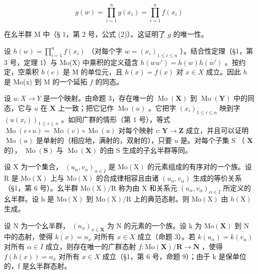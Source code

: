\[
g (w) = \prod_ {i = 1} ^ {n} g (x _ {i}) = \prod_ {i = 1} ^ {n} f (x _ {i})
\]

在幺半群 M 中（§ 1，第 2 号，公式 (2)）。这证明了 \(g\) 的唯一性。

设 \(h(w) = \prod_{i=1}^{n} f(x_i)\) （对每个字 \(w = (x_i)_{1 \leqslant i \leqslant n}\) ）。结合性定理（§1，第 3 号，定理 1）与 Mo(X) 中乘积的定义蕴含 \(h(ww') = h(w)h(w')\) 。按约定，空乘积 \(h(e)\) 是 M 的单位元，且 \(h(x) = f(x)\) 对 \(x \in X\) 成立。因此 \(h\) 是 Mo(x) 到 M 的一个延拓 \(f\) 的同态。

设 \(u: X \to Y\) 是一个映射。由命题 3，存在唯一的 \(\operatorname{Mo}(\mathbf{X})\) 到 \(\operatorname{Mo}(\mathbf{Y})\) 中的同态，它与 \(u\) 在 \(\mathbf{X}\) 上一致；把它记作 \(\operatorname{Mo}(u)\) 。它把字 \((x_i)_{1 \leqslant i \leqslant n}\) 映到字 \((u(x_i))_{1 \leqslant i \leqslant n}\) 。如同广群的情形（第 1 号），等式 \(\operatorname{Mo}(v \circ u) = \operatorname{Mo}(v) \circ \operatorname{Mo}(u)\) 对每个映射 \(v: \mathbf{Y} \to \mathbf{Z}\) 成立，并且可以证明 \(\operatorname{Mo}(u)\) 是单射的（相应地，满射的，双射的），只要 \(u\) 是。对每个子集 S （ \(\mathbf{X}\) 的）， \(\operatorname{Mo}(\mathbf{S})\) 与 \(\operatorname{Mo}(\mathbf{X})\) 的由 S 生成的子幺半群等同。

设 X 为一个集合， \((u_{\alpha}, v_{\alpha})_{\alpha \in I}\) 是 \(\mathrm{Mo}(\mathrm{X})\) 的元素组成的有序对的一个族。设 R 是 \(\mathrm{Mo}(\mathrm{X})\) 上与 \(\mathrm{Mo}(\mathrm{X})\) 的合成律相容且由诸 \((u_{\alpha}, v_{\alpha})\) 生成的等价关系（§1，第 6 号）。幺半群 \(\mathrm{Mo}(\mathrm{X})/\mathrm{R}\) 称为由 X 和关系元 \((u_{\alpha}, v_{\alpha})_{\alpha \in I}\) 所定义的幺半群。设 h 是 \(\mathrm{Mo}(\mathrm{X})\) 到 \(\mathrm{Mo}(\mathrm{X})/\mathrm{R}\) 上的典范态射。则 \(\mathrm{Mo}(\mathrm{X})\) 由 \(h(\mathrm{X})\) 生成。

设 N 为一个幺半群， \((n_{x})_{x\in\mathbf{X}}\) 为 N 的元素的一个族。设 k 为 \(\mathrm{Mo}(\mathbf{X})\) 到 N 中的态射，使得 \(k(x)=n_{x}\) 对所有 \(x\in X\) 成立（命题 3）。若 \(k(u_{\alpha})=k(v_{\alpha})\) 对所有 \(\alpha\in I\) 成立，则存在唯一的广群态射 \(f:\mathrm{Mo}(\mathbf{X})/\mathbf{R}\to\mathbf{N}\) ，使得 \(f(h(x))=n_{x}\) 对所有 \(x\in X\) 成立（§1，第 6 号，命题 9）；由于 k 是保单位的，f 是幺半群态射。
